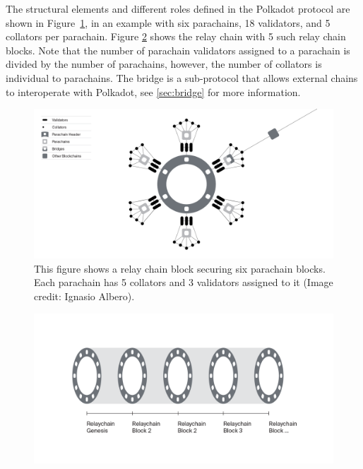 The structural elements and different roles defined in the Polkadot protocol are shown in Figure~\ref{fig:roles}, in an example with six parachains, 18 validators, and 5 collators per parachain. Figure \ref{fig:relaychain} shows the relay chain with 5 such relay chain blocks. Note that the number of parachain validators assigned to a parachain is divided by the number of parachains, however, the number of collators is individual to parachains.  The bridge is a sub-protocol that allows external chains to interoperate with Polkadot, see \ref{sec:bridge} for more information. 
\begin{figure}[h]
	\centering
	\includegraphics[width=\textwidth]{images/Network@2x.png}
	\caption{This figure shows a relay chain block securing six parachain blocks. Each parachain has  5 collators and 3 validators assigned to it  (Image credit: Ignasio Albero).}
	\label{fig:roles}
\end{figure}
\begin{figure}[h]
	\centering
	\includegraphics[width=\textwidth]{images/Relaychain.png}
	\caption{}
	\label{fig:relaychain}
\end{figure}


